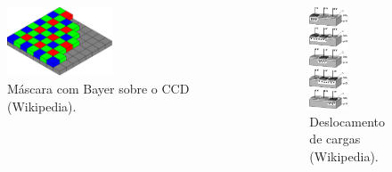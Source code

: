 \begin{frame}[allowframebreaks]
  \begin{columns}[c]
    \begin{figure}[h!]
    \centering
    \includegraphics[width=0.5\textwidth]{images/bayer-patern.pdf}
    \caption{Máscara com Bayer sobre o CCD (Wikipedia).}
    \label{fig:bayer}
    \end{figure}
    \begin{figure}[h!]
    \centering
    \includegraphics[width=0.5\textwidth]{images/ccd-charges.png}
    \caption{Deslocamento de cargas (Wikipedia).}
    \label{fig:charges}
    \end{figure}
  \end{columns}


\end{frame}
